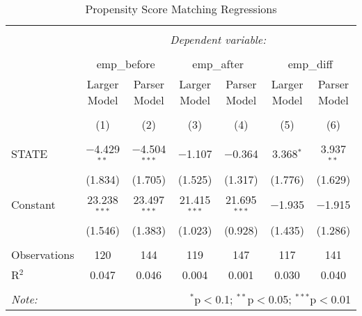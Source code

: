 
\begin{table}[H] \centering 
  \caption{Propensity Score Matching Regressions} 
  \label{} 
\begin{tabular}{@{\extracolsep{-5pt}}lcccccc} 
\\[-1.8ex]\hline 
\hline \\[-1.8ex] 
 & \multicolumn{6}{c}{\textit{Dependent variable:}} \\ 
\cline{2-7} 
\\[-1.8ex] & \multicolumn{2}{c}{emp\_before} & \multicolumn{2}{c}{emp\_after} & \multicolumn{2}{c}{emp\_diff} \\ 
 & Larger Model & Parser Model & Larger Model & Parser Model & Larger Model & Parser Model \\ 
\\[-1.8ex] & (1) & (2) & (3) & (4) & (5) & (6)\\ 
\hline \\[-1.8ex] 
 STATE & $-$4.429$^{**}$ & $-$4.504$^{***}$ & $-$1.107 & $-$0.364 & 3.368$^{*}$ & 3.937$^{**}$ \\ 
  & (1.834) & (1.705) & (1.525) & (1.317) & (1.776) & (1.629) \\ 
  Constant & 23.238$^{***}$ & 23.497$^{***}$ & 21.415$^{***}$ & 21.695$^{***}$ & $-$1.935 & $-$1.915 \\ 
  & (1.546) & (1.383) & (1.023) & (0.928) & (1.435) & (1.286) \\ 
 \hline \\[-1.8ex] 
Observations & 120 & 144 & 119 & 147 & 117 & 141 \\ 
R$^{2}$ & 0.047 & 0.046 & 0.004 & 0.001 & 0.030 & 0.040 \\ 
\hline 
\hline \\[-1.8ex] 
\textit{Note:}  & \multicolumn{6}{r}{$^{*}$p$<$0.1; $^{**}$p$<$0.05; $^{***}$p$<$0.01} \\ 
\end{tabular} 
\end{table} 
